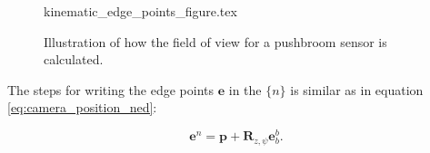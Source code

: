\begin{figure}
	{kinematic_edge_points_figure.tex}
	\caption{Illustration of how the field of view for a pushbroom sensor is calculated.}
	\label{fig:kinematics_edge_points}
\end{figure}

The steps for writing the edge points $\mathbf{e}$ in the $\{n\}$ is similar as in equation \ref{eq:camera_position_ned}:

\begin{equation}
	\mathbf{e}^n = \mathbf{p} + \mathbf{R}_{z,\psi} \mathbf{e}_b^b.
\end{equation}